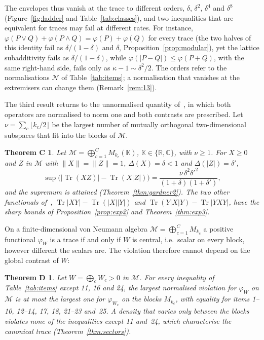 \documentclass[11pt]{article}
\DeclareMathOperator{\Tr}{Tr}
\newcommand{\C}{\mathbb{C}}
\newcommand{\R}{\mathbb{R}}
\newcommand{\M}{\mathcal{M}}
\newcommand{\cN}{\mathcal{N}}
\theoremstyle{plain}
\newtheorem*{thmC}{Theorem C}
\newtheorem*{thmD}{Theorem D}
\theoremstyle{definition}
\theoremstyle{remark}
\begin{document}
The envelopes thus vanish at the trace to different orders, $\delta$, $\delta^2$, $\delta^4$ and $\delta^8$
(Figure~\ref{fig:ladder} and Table~\ref{tab:classes}), and two inequalities that are equivalent for traces may fail at
different rates. For instance, $\varphi(P\vee Q)+\varphi(P\wedge Q)=\varphi(P)+\varphi(Q)$ for every trace (the two halves of this
identity fail as $\delta/(1-\delta)$ and $\delta$, Proposition~\ref{prop:modular}), yet the lattice
subadditivity fails as $\delta/(1-\delta)$, while $\varphi(|P-Q|)\le\varphi(P+Q)$, with the same right-hand side, fails only as
$\kappa-1\sim\delta^2/2$. The orders refer to the normalisations $\cN$ of Table~\ref{tab:items}; a normalisation that
vanishes at the extremisers can change them (Remark~\ref{rem:13}).

The third result returns to the unnormalised quantity of~\cite{abed2024}, in which both operators are normalised to
norm one and both contrasts are prescribed. Let $\nu=\sum_c\lfloor k_c/2\rfloor$ be the largest number of mutually
orthogonal two-dimensional subspaces that fit into the blocks of $\M$.

\begin{thmC}
Let $\M=\bigoplus_{c=1}^CM_{k_c}(\mathbb K)$, $\mathbb K\in\{\R,\C\}$, with $\nu\ge1$. For $X\ge0$ and $Z$ in $\M$ with
$\|X\|=\|Z\|=1$, $\Delta(X)=\delta<1$ and $\Delta(|Z|)=\delta'$,
\[
  \sup\bigl(|\Tr(XZ)|-\Tr(X|Z|)\bigr)=\frac{\nu\,\delta^2\delta'^2}{(1+\delta)(1+\delta')},
\]
and the supremum is attained (Theorem~\ref{thm:gardner2}). The two other functionals of~\cite{abed2024},
$\Tr|XY|-\Tr(|X||Y|)$ and $\Tr(Y|X|Y)-\Tr|YXY|$, have the sharp bounds of Proposition~\ref{prop:exp2} and
Theorem~\ref{thm:exp3}.
\end{thmC}

On a finite-dimensional von Neumann algebra $\M=\bigoplus_{c=1}^CM_{k_c}$ a positive functional $\varphi_W$ is a trace if
and only if $W$ is central, i.e.\ scalar on every block, however different the scalars are. The violation therefore
cannot depend on the global contrast of $W$:

\begin{thmD}
Let $W=\bigoplus_cW_c>0$ in $\M$. For every inequality of Table~\ref{tab:items} except 11, 16 and 24, the largest
normalised violation for $\varphi_W$ on $\M$ is at most the largest one for $\varphi_{W_c}$ on the blocks $M_{k_c}$, with
equality for items 1--10, 12--14, 17, 18, 21--23 and~25. A density that varies only between the blocks violates none of the
inequalities except 11 and~24, which characterise the canonical trace (Theorem~\ref{thm:sectors}).
\end{thmD}
\end{document}
